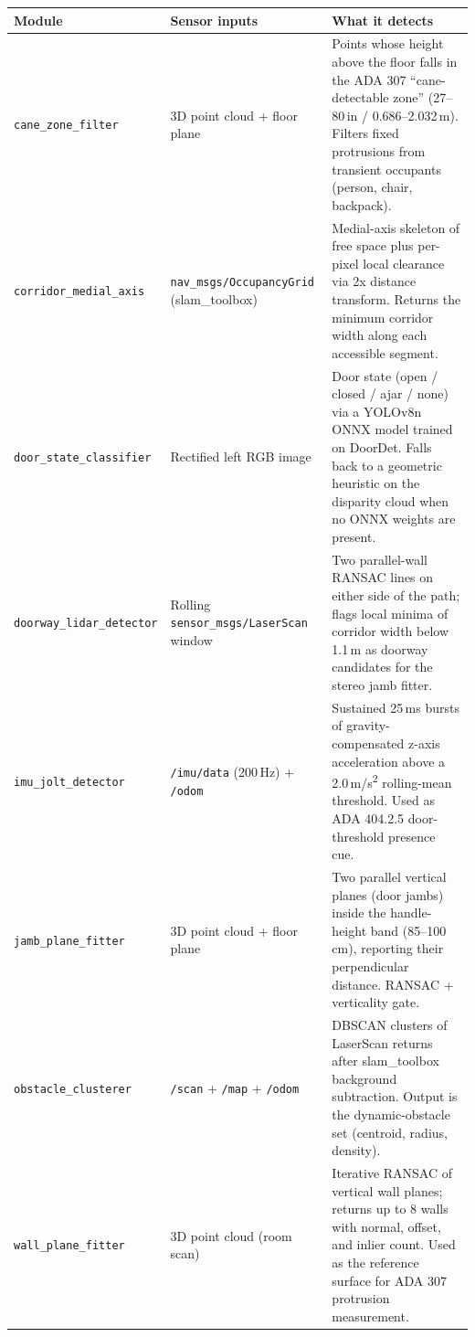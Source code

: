 \begin{center}
\begin{tabular}{|p{3.6cm}|p{4.2cm}|p{6.8cm}|}
\hline
\textbf{Module} & \textbf{Sensor inputs} & \textbf{What it detects} \\
\hline
\texttt{cane\_zone\_filter}        & 3D point cloud + floor plane                 & Points whose height above the floor falls in the ADA 307 ``cane-detectable zone'' (27--80\,in / 0.686--2.032\,m). Filters fixed protrusions from transient occupants (person, chair, backpack). \\
\hline
\texttt{corridor\_medial\_axis}    & \texttt{nav\_msgs/OccupancyGrid} (slam\_toolbox) & Medial-axis skeleton of free space plus per-pixel local clearance via 2x distance transform. Returns the minimum corridor width along each accessible segment. \\
\hline
\texttt{door\_state\_classifier}   & Rectified left RGB image                     & Door state (open / closed / ajar / none) via a YOLOv8n ONNX model trained on DoorDet. Falls back to a geometric heuristic on the disparity cloud when no ONNX weights are present. \\
\hline
\texttt{doorway\_lidar\_detector}  & Rolling \texttt{sensor\_msgs/LaserScan} window & Two parallel-wall RANSAC lines on either side of the path; flags local minima of corridor width below 1.1\,m as doorway candidates for the stereo jamb fitter. \\
\hline
\texttt{imu\_jolt\_detector}       & \texttt{/imu/data} (200\,Hz) + \texttt{/odom}    & Sustained 25\,ms bursts of gravity-compensated z-axis acceleration above a 2.0\,m/s\textsuperscript{2} rolling-mean threshold. Used as ADA 404.2.5 door-threshold presence cue. \\
\hline
\texttt{jamb\_plane\_fitter}       & 3D point cloud + floor plane                 & Two parallel vertical planes (door jambs) inside the handle-height band (85--100\,cm), reporting their perpendicular distance. RANSAC + verticality gate. \\
\hline
\texttt{obstacle\_clusterer}       & \texttt{/scan} + \texttt{/map} + \texttt{/odom}  & DBSCAN clusters of LaserScan returns after slam\_toolbox background subtraction. Output is the dynamic-obstacle set (centroid, radius, density). \\
\hline
\texttt{wall\_plane\_fitter}       & 3D point cloud (room scan)                   & Iterative RANSAC of vertical wall planes; returns up to 8 walls with normal, offset, and inlier count. Used as the reference surface for ADA 307 protrusion measurement. \\
\hline
\end{tabular}
\end{center}

